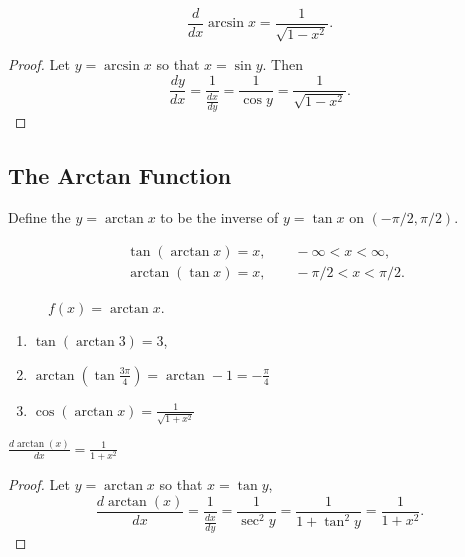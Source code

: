 \documentclass[../calc1-main.tex]{subfiles}
\begin{document}
\begin{theorem}
\[
  \frac{d }{dx} \arcsin x = \frac{1}{\sqrt{1-x^2}}.
\]

\end{theorem}
\begin{proof}
  Let $y = \arcsin x$ so that $x = \sin y$. Then
  \[
    \frac{dy}{dx} = \frac{1}{\frac{dx}{dy}} = \frac{1}{\cos y} = \frac{1}{\sqrt{1-x^2}}.
  \]
\end{proof}

\subsection*{The Arctan Function}

Define the $y = \arctan x$ to be the inverse of $y=\tan x$ on $(-\pi/2, \pi/2)$.

\begin{align*}
  & \tan (\arctan x) = x, \qquad -\infty < x < \infty, \\
  & \arctan (\tan x) = x, \qquad -\pi/2 < x < \pi/2.
\end{align*}

\begin{figure}[H]
  \centering
  
  \caption{$f(x) = \arctan x$.}
\end{figure}

\begin{example}
  \begin{enumerate}
    \item $\tan (\arctan 3) = 3$,

    \item $\arctan (\tan \frac{3\pi}{4}) = \arctan -1 = -\frac{\pi}{4}$

    \item $\cos (\arctan x) = \frac{1}{\sqrt{1+x^2}}$

  \end{enumerate}
\end{example}

\begin{theorem}
  $\frac{d \arctan(x)}{dx} = \frac{1}{1+x^2}$
\end{theorem}

\begin{proof}
  Let $y=\arctan x$ so that $x = \tan y$,
  \[
    \frac{d \arctan(x)}{dx} = \frac{1}{\frac{dx}{dy}} = \frac{1}{\sec^2 y} = \frac{1}{1+ \tan^2 y} = \frac{1}{1+x^2}.
  \]
\end{proof}
\end{document}
